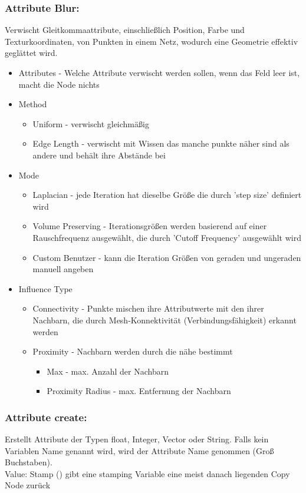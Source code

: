 \documentclass[paper=a4,fontsize=12pt,ngerman]{scrartcl}
\begin{document}
 	\subsubsection*{Attribute Blur:}
 	Verwischt Gleitkommaattribute, einschließlich Position, Farbe und Texturkoordinaten, von Punkten in einem Netz, wodurch eine Geometrie effektiv geglättet wird.
 	\begin{itemize}
 		\item Attributes - Welche Attribute verwischt werden sollen, wenn das Feld leer ist, macht die Node nichts
 		\item Method \begin{itemize} 
 			\item Uniform - verwischt gleichmäßig
 			\item Edge Length - verwischt mit Wissen das manche punkte näher sind als andere und behält ihre Abstände bei 
 		\end{itemize}
 		\item Mode	\begin{itemize} 
 			\item Laplacian - jede Iteration hat dieselbe Größe die durch 'step size' definiert wird
 			\item Volume Preserving - Iterationsgrößen werden basierend auf einer Rauschfrequenz ausgewählt, die durch 'Cutoff Frequency' ausgewählt wird
 			\item Custom	Benutzer - kann die Iteration Größen von geraden und ungeraden manuell angeben	
 		\end{itemize}
 		\item Influence Type 
 		\begin{itemize}
 			\item Connectivity - Punkte mischen ihre Attributwerte mit den ihrer Nachbarn, die durch  Mesh-Konnektivität (Verbindungsfähigkeit) erkannt werden
 			\item Proximity - Nachbarn werden durch die nähe bestimmt 
 			\begin{itemize}
 				\item Max - max. Anzahl der Nachbarn
 				\item Proximity Radius - max. Entfernung der Nachbarn
 			\end{itemize}
 		\end{itemize}
 	\end{itemize}
 	
 	\subsubsection*{Attribute create:}
 	Erstellt Attribute der Typen float, Integer, Vector oder String. Falls kein Variablen Name genannt wird, wird der Attribute Name genommen (Groß Buchstaben).\\
 	Value: Stamp ()	gibt eine stamping Variable eine meist danach liegenden Copy Node zurück
 	
\end{document}
